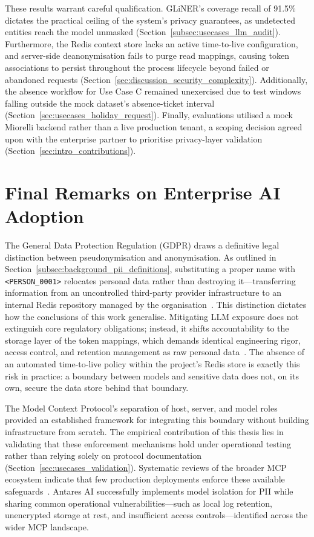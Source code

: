 These results warrant careful qualification. GLiNER's coverage recall of 91.5\% dictates the practical ceiling of the system's privacy guarantees, as undetected entities reach the model unmasked (Section~\ref{subsec:usecases_llm_audit}). Furthermore, the Redis context store lacks an active time-to-live configuration, and server-side deanonymisation fails to purge read mappings, causing token associations to persist throughout the process lifecycle beyond failed or abandoned requests (Section~\ref{sec:discussion_security_complexity}). Additionally, the absence workflow for Use Case C remained unexercised due to test windows falling outside the mock dataset's absence-ticket interval (Section~\ref{sec:usecases_holiday_request}). Finally, evaluations utilised a mock Miorelli backend rather than a live production tenant, a scoping decision agreed upon with the enterprise partner to prioritise privacy-layer validation (Section~\ref{sec:intro_contributions}).

\section{Final Remarks on Enterprise AI Adoption}
\label{sec:conclusions_final_remarks}

The General Data Protection Regulation (GDPR) draws a definitive legal distinction between pseudonymisation and anonymisation. As outlined in Section~\ref{subsec:background_pii_definitions}, substituting a proper name with \texttt{<PERSON\_0001>} relocates personal data rather than destroying it---transferring information from an uncontrolled third-party provider infrastructure to an internal Redis repository managed by the organisation~\cite{gdpr2016}. This distinction dictates how the conclusions of this work generalise. Mitigating LLM exposure does not extinguish core regulatory obligations; instead, it shifts accountability to the storage layer of the token mappings, which demands identical engineering rigor, access control, and retention management as raw personal data~\cite{enisa2019pseudonymisation}. The absence of an automated time-to-live policy within the project's Redis store is exactly this risk in practice: a boundary between models and sensitive data does not, on its own, secure the data store behind that boundary.

The Model Context Protocol's separation of host, server, and model roles~\cite{anthropic2024mcp} provided an established framework for integrating this boundary without building infrastructure from scratch. The empirical contribution of this thesis lies in validating that these enforcement mechanisms hold under operational testing rather than relying solely on protocol documentation (Section~\ref{sec:usecases_validation}). Systematic reviews of the broader MCP ecosystem indicate that few production deployments enforce these available safeguards~\cite{hou2025mcpsecurity}. Antares AI successfully implements model isolation for PII while sharing common operational vulnerabilities---such as local log retention, unencrypted storage at rest, and insufficient access controls---identified across the wider MCP landscape.


